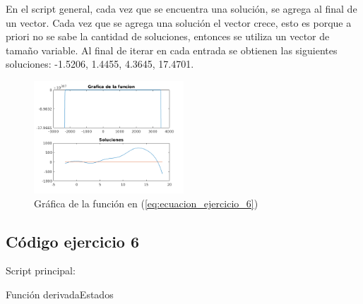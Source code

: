 \documentclass[12pt,letterpaper]{article}
\begin{document}
En el script general, cada vez que se encuentra una solución, se agrega al final de un vector. Cada vez que se agrega una solución el vector crece, esto es porque a priori no se sabe la cantidad de soluciones, entonces se utiliza un vector de tamaño variable. Al final de iterar en cada entrada se obtienen las siguientes soluciones: -1.5206, 1.4455, 4.3645, 17.4701.

\begin{figure}
	\centering
	\includegraphics[width=0.5\textwidth]{pictures/ejercicio_6_grafica}
	\caption{Gráfica de la función en (\ref{eq:ecuacion_ejercicio_6})}
	\label{fig:ejercicio_6_grafica}
\end{figure} 

\subsection{Código ejercicio 6}
Script principal:

Función derivadaEstados

\end{document}
